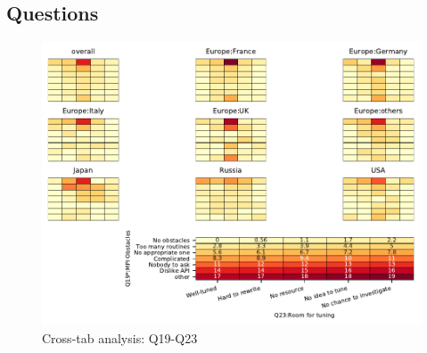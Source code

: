 
\subsection{Questions}


\begin{figure}
\begin{center}
\includegraphics[width=12cm]{../pdfs/Q19-Q23.pdf}
\caption{Cross-tab analysis: Q19-Q23}
\label{fig:Q19-Q23}
\end{center}
\end{figure}
